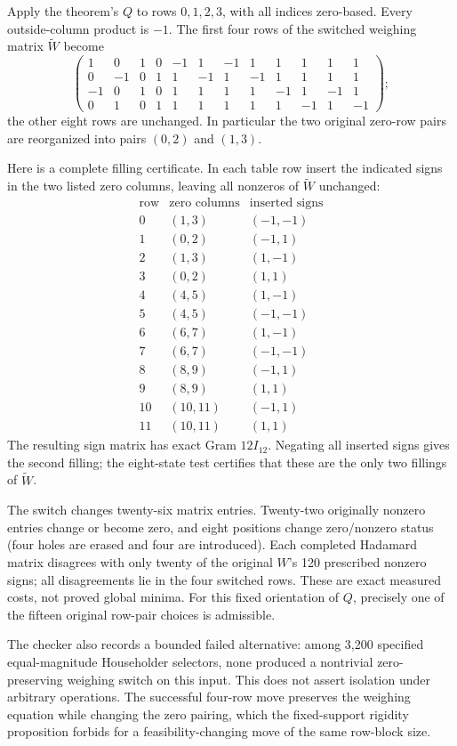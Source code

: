 \documentclass[11pt]{article}
\begin{document}
Apply the theorem's $Q$ to rows $0,1,2,3$, with all indices zero-based.
Every outside-column product is $-1$. The first four rows of the
switched weighing matrix $\widetilde W$ become
\[
\begin{pmatrix}
1&0&1&0&-1&1&-1&1&1&1&1&1\\
0&-1&0&1&1&-1&1&-1&1&1&1&1\\
-1&0&1&0&1&1&1&1&-1&1&-1&1\\
0&1&0&1&1&1&1&1&1&-1&1&-1
\end{pmatrix};
\]
the other eight rows are unchanged. In particular the two original
zero-row pairs are reorganized into pairs $(0,2)$ and $(1,3)$.

Here is a complete filling certificate. In each table row insert
the indicated signs in the two listed zero columns, leaving all
nonzeros of $\widetilde W$ unchanged:
\[
\begin{array}{c|c|c}
\text{row}&\text{zero columns}&\text{inserted signs}\\\hline
0&(1,3)&(-1,-1)\\1&(0,2)&(-1,1)\\
2&(1,3)&(1,-1)\\3&(0,2)&(1,1)\\
4&(4,5)&(1,-1)\\5&(4,5)&(-1,-1)\\
6&(6,7)&(1,-1)\\7&(6,7)&(-1,-1)\\
8&(8,9)&(-1,1)\\9&(8,9)&(1,1)\\
10&(10,11)&(-1,1)\\11&(10,11)&(1,1)
\end{array}
\]
The resulting sign matrix has exact Gram $12I_{12}$. Negating
all inserted signs gives the second filling; the eight-state test
certifies that these are the only two fillings of $\widetilde W$.

The switch changes twenty-six matrix entries. Twenty-two originally
nonzero entries change or become zero, and eight positions change
zero/nonzero status (four holes are erased and four are introduced).
Each completed Hadamard matrix disagrees with only twenty of the
original $W$'s 120 prescribed nonzero signs; all disagreements lie
in the four switched rows. These are exact measured costs, not
proved global minima. For this fixed orientation of $Q$, precisely
one of the fifteen original row-pair choices is admissible.

The checker also records a bounded failed alternative: among 3,200
specified equal-magnitude Householder selectors, none produced a
nontrivial zero-preserving weighing switch on this input. This does
not assert isolation under arbitrary operations. The successful
four-row move preserves the weighing equation while changing the
zero pairing, which the fixed-support rigidity proposition forbids
for a feasibility-changing move of the same row-block size.
\end{document}
